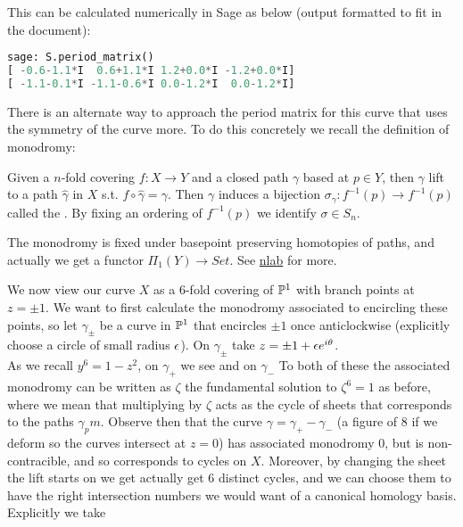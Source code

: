 \documentclass{article}
\begin{document}
This can be calculated numerically in Sage as below (output formatted to fit in the document):
\begin{lstlisting}[language=Python,frame=single]
sage: S.period_matrix()
[ -0.6-1.1*I  0.6+1.1*I 1.2+0.0*I -1.2+0.0*I]
[ -1.1-0.1*I -1.1-0.6*I 0.0-1.2*I  0.0-1.2*I]
\end{lstlisting}
There is an alternate way to approach the period matrix for this curve that uses the symmetry of the curve more. To do this concretely we recall the definition of monodromy: 
\begin{definition}
	Given a $n$-fold covering $f:X \to Y$ and a closed path $\gamma$ based at $p \in Y$, then $\gamma$ lift to a path $\hat{\gamma}$ in $X$ s.t. $f \circ \hat{\gamma}=\gamma$. Then $\gamma$ induces a bijection $\sigma_\gamma : f^{-1}(p) \to f^{-1}(p)$ called the . By fixing an ordering of $f^{-1}(p)$ we identify $\sigma \in S_n$.  
\end{definition}
\begin{remark}
The monodromy is fixed under basepoint preserving homotopies of paths, and actually we get a functor $\Pi_1(Y) \to Set$. See \href{https://ncatlab.org/nlab/show/monodromy}{nlab} for more. 
\end{remark}
We now view our curve $X$ as a 6-fold covering of $\mathbb{P}^1$ with branch points at $z=\pm 1$. We want to first calculate the monodromy associated to encircling these points, so let $\gamma_\pm$ be a curve in $\mathbb{P}^1$ that encircles $\pm 1$ once anticlockwise (explicitly choose a circle of small radius $\epsilon$). On $\gamma_\pm$ take $z = \pm1 + \epsilon e^{i\theta}$. \\
As we recall $y^6 = 1-z^2$, on $\gamma_+$ we see 
and on $\gamma_-$ 
To both of these the associated monodromy can be written as $\zeta$ the fundamental solution to $\zeta^6=1$ as before, where we mean that multiplying by $\zeta$ acts as the cycle of sheets that corresponds to the paths $\gamma_pm$. Observe then that the curve $\gamma = \gamma_+ - \gamma_-$ (a figure of 8 if we deform so the curves intersect at $z=0$) has associated monodromy 0, but is non-contracible, and so corresponds to cycles on $X$. Moreover, by changing the sheet the lift starts on we get actually get $6$ distinct cycles, and we can choose them to have the right intersection numbers we would want of a canonical homology basis. Explicitly we take
\end{document}
